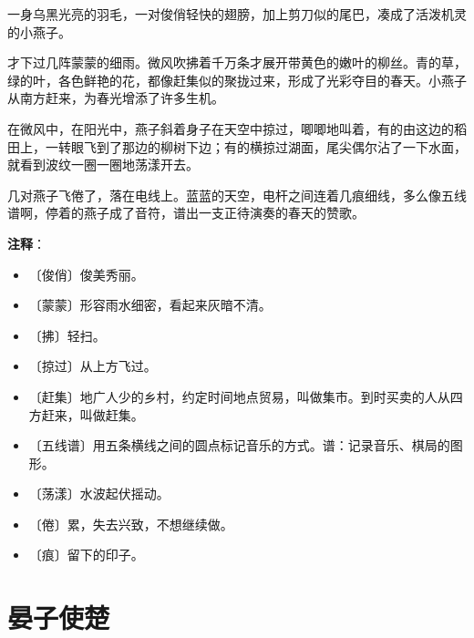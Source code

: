 \documentclass[12pt,UTF-8,openany]{ctexbook}
\begin{document}
\begin{large}
    
    一身乌黑光亮的羽毛，一对俊俏轻快的翅膀，加上剪刀似的尾巴，凑成了活泼机灵的小燕子。
    
    才下过几阵蒙蒙的细雨。微风吹拂着千万条才展开带黄色的嫩叶的柳丝。青的草，绿的叶，各色鲜艳的花，都像赶集似的聚拢过来，形成了光彩夺目的春天。小燕子从南方赶来，为春光增添了许多生机。
    
    在微风中，在阳光中，燕子斜着身子在天空中掠过，唧唧地叫着，有的由这边的稻田上，一转眼飞到了那边的柳树下边；有的横掠过湖面，尾尖偶尔沾了一下水面，就看到波纹一圈一圈地荡漾开去。
    
    几对燕子飞倦了，落在电线上。蓝蓝的天空，电杆之间连着几痕细线，多么像五线谱啊，停着的燕子成了音符，谱出一支正待演奏的春天的赞歌。
    
\end{large}


\newpage

\textbf{注释}：

\vspace{-1em}

\begin{itemize}
    \setlength\itemsep{-0.2em}
    \item 〔俊俏〕俊美秀丽。
    \item 〔蒙蒙〕形容雨水细密，看起来灰暗不清。
    \item 〔拂〕轻扫。
    \item 〔掠过〕从上方飞过。
    \item 〔赶集〕地广人少的乡村，约定时间地点贸易，叫做集市。到时买卖的人从四方赶来，叫做赶集。
    \item 〔五线谱〕用五条横线之间的圆点标记音乐的方式。谱：记录音乐、棋局的图形。
    \item 〔荡漾〕水波起伏摇动。
    \item 〔倦〕累，失去兴致，不想继续做。
    \item 〔痕〕留下的印子。
\end{itemize}

\chapter{晏子使楚}
\end{document}
